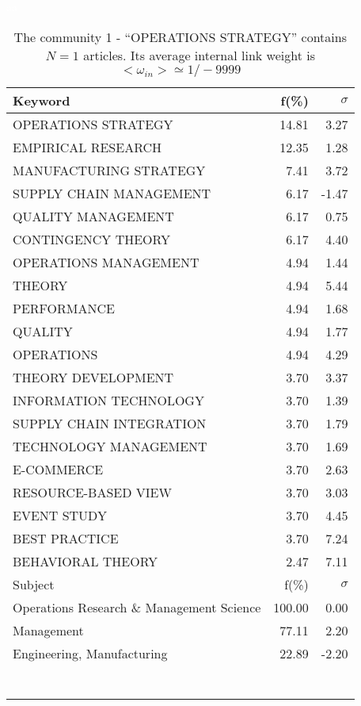 \documentclass[a4paper,11pt]{report}
\begin{document}
\begin{landscape}
\clearpage

\begin{table}[!ht]
\caption{The community 1 - ``OPERATIONS STRATEGY'' contains $N = 1$ articles. Its average internal link weight is $<\omega_{in}> \simeq 1/-9999$ }
\textcolor{white}{aa}\\
{\scriptsize\begin{tabular}{|l r r|}
\hline
Keyword & f(\%) & $\sigma$\\
\hline
OPERATIONS STRATEGY & 14.81 & 3.27\\
EMPIRICAL RESEARCH & 12.35 & 1.28\\
MANUFACTURING STRATEGY & 7.41 & 3.72\\
SUPPLY CHAIN MANAGEMENT & 6.17 & -1.47\\
QUALITY MANAGEMENT & 6.17 & 0.75\\
CONTINGENCY THEORY & 6.17 & 4.40\\
OPERATIONS MANAGEMENT & 4.94 & 1.44\\
THEORY & 4.94 & 5.44\\
PERFORMANCE & 4.94 & 1.68\\
QUALITY & 4.94 & 1.77\\
OPERATIONS & 4.94 & 4.29\\
THEORY DEVELOPMENT & 3.70 & 3.37\\
INFORMATION TECHNOLOGY & 3.70 & 1.39\\
SUPPLY CHAIN INTEGRATION & 3.70 & 1.79\\
TECHNOLOGY MANAGEMENT & 3.70 & 1.69\\
E-COMMERCE & 3.70 & 2.63\\
RESOURCE-BASED VIEW & 3.70 & 3.03\\
EVENT STUDY & 3.70 & 4.45\\
BEST PRACTICE & 3.70 & 7.24\\
BEHAVIORAL THEORY & 2.47 & 7.11\\
\hline
\hline
Subject & f(\%) & $\sigma$\\
\hline
Operations Research \& Management Science & 100.00 & 0.00\\
Management & 77.11 & 2.20\\
Engineering, Manufacturing & 22.89 & -2.20\\
 &  & \\
 &  & \\
 &  & \\
 &  & \\
 &  & \\
 &  & \\
 &  & \\

\end{tabular}}
\end{table}
\end{landscape}
\end{document}
